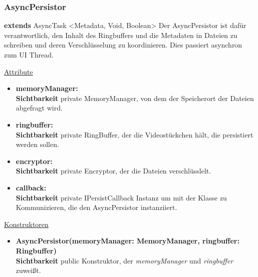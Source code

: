 \subsubsection{AsyncPersistor} \label{app:klasse:AsyncPersistor}
\textbf{extends} AsyncTask <Metadata, Void, Boolean> \newline
Der AsyncPersistor ist dafür verantwortlich, den Inhalt des Ringbuffers und die Metadaten in Dateien zu schreiben und deren Verschlüsselung zu koordinieren. Dies passiert asynchron zum UI Thread.
\newline

\underline{Attribute}
\begin{itemize}
\itemsep0pt
\item \textbf{memoryManager: } \hfill\\ 
\textbf{Sichtbarkeit} private \newline
MemoryManager, von dem der Speicherort der Dateien abgefragt wird.

\item \textbf{ringbuffer: } \hfill\\ 
\textbf{Sichtbarkeit} private \newline
RingBuffer, der die Videostückchen hält, die persistiert werden sollen.

\item \textbf{encryptor: } \hfill\\ 
\textbf{Sichtbarkeit} private \newline
Encryptor, der die Dateien verschlüsslelt.

\item \textbf{callback: } \hfill\\ 
\textbf{Sichtbarkeit} private \newline
IPersistCallback Instanz um mit der Klasse zu Kommunizieren, die den AsyncPersistor instanziiert.

\end{itemize}

\underline{Konstruktoren}\newline
\begin{itemize}
\itemsep0pt
\item \textbf{AsyncPersistor(memoryManager: MemoryManager, ringbuffer: Ringbuffer)} \hfill\\
\textbf{Sichtbarkeit} public\newline
Konstruktor, der \textit{memoryManager} und \textit{ringbuffer} zuweißt.
\end{itemize}

